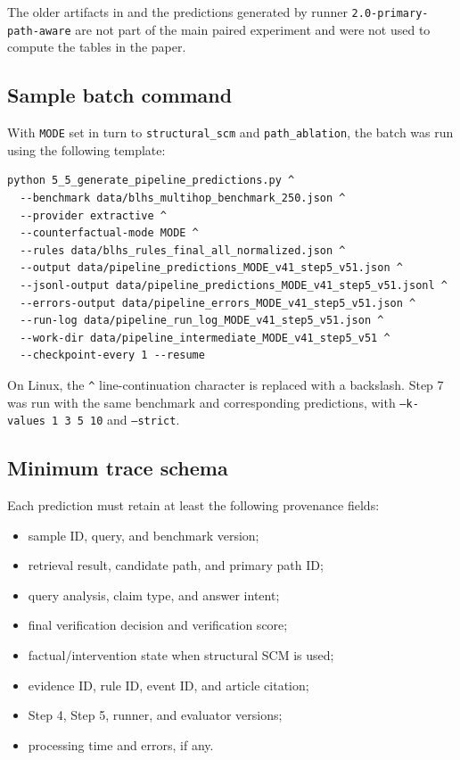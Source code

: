 The older artifacts in
 and the predictions generated
by runner \texttt{2.0-primary-path-aware} are not part of the main paired
experiment and were not used to compute the tables in the paper.

\subsection{Sample batch command}

With \texttt{MODE} set in turn to \texttt{structural\_scm} and
\texttt{path\_ablation}, the batch was run using the following template:

\begin{verbatim}
python 5_5_generate_pipeline_predictions.py ^
  --benchmark data/blhs_multihop_benchmark_250.json ^
  --provider extractive ^
  --counterfactual-mode MODE ^
  --rules data/blhs_rules_final_all_normalized.json ^
  --output data/pipeline_predictions_MODE_v41_step5_v51.json ^
  --jsonl-output data/pipeline_predictions_MODE_v41_step5_v51.jsonl ^
  --errors-output data/pipeline_errors_MODE_v41_step5_v51.json ^
  --run-log data/pipeline_run_log_MODE_v41_step5_v51.json ^
  --work-dir data/pipeline_intermediate_MODE_v41_step5_v51 ^
  --checkpoint-every 1 --resume
\end{verbatim}

On Linux, the \texttt{\^{}} line-continuation character is replaced with a
backslash. Step 7 was run with the same benchmark and corresponding
predictions, with \texttt{--k-values 1 3 5 10} and \texttt{--strict}.

\subsection{Minimum trace schema}

Each prediction must retain at least the following provenance fields:

\begin{itemize}
    \item sample ID, query, and benchmark version;
    \item retrieval result, candidate path, and primary path ID;
    \item query analysis, claim type, and answer intent;
    \item final verification decision and verification score;
    \item factual/intervention state when structural SCM is used;
    \item evidence ID, rule ID, event ID, and article citation;
    \item Step 4, Step 5, runner, and evaluator versions;
    \item processing time and errors, if any.
\end{itemize}

